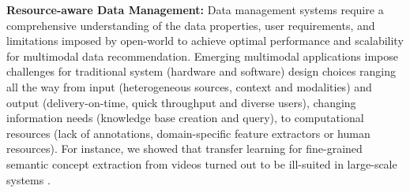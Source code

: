 \textbf{Resource-aware Data Management:}
%
%
Data management systems require a comprehensive understanding of the data properties, user requirements, and limitations imposed by open-world to achieve optimal performance and scalability 
for multimodal data recommendation. 
Emerging multimodal applications impose challenges for traditional system (hardware and software) design choices ranging all the way from input (heterogeneous sources, context and modalities) and output (delivery-on-time, quick throughput and diverse users), changing information needs (knowledge base creation and query), to computational resources (lack of annotations, domain-specific feature extractors or human resources). 
For instance, we showed that transfer learning for fine-grained semantic concept extraction from videos turned out to be ill-suited in large-scale systems \cite{stonebraker2020surveillance}.
